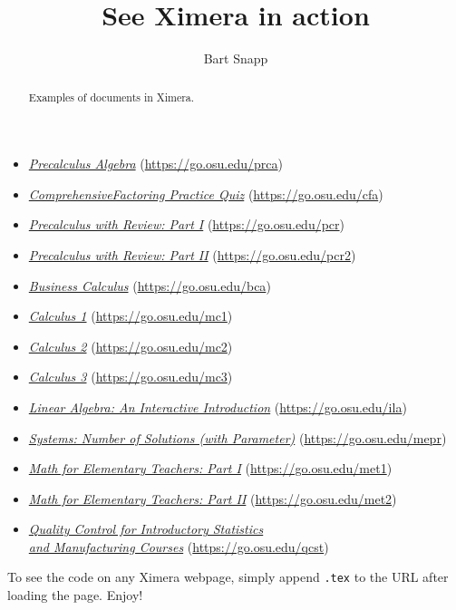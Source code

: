 \documentclass{ximera}
\title{See Ximera in action}
\author{Bart Snapp}
\begin{document}
\begin{abstract}
Examples of documents in Ximera.
\end{abstract}
\maketitle


\renewcommand*{\link}[2][]{\href{#2}{#1}%
\hfill(\url{#2})
}

\begin{itemize}[label={},leftmargin=*]
\item \link[\textit{Precalculus Algebra}]{https://go.osu.edu/prca} 
\item \link[\textit{ComprehensiveFactoring   Practice   Quiz}]{https://go.osu.edu/cfa}
\item \link[\textit{Precalculus with Review: Part I}]{https://go.osu.edu/pcr}        
\item \link[\textit{Precalculus with Review: Part II}]{https://go.osu.edu/pcr2}        
\item \link[\textit{Business Calculus}]{https://go.osu.edu/bca}
\item \link[\textit{Calculus 1}]{https://go.osu.edu/mc1}
\item \link[\textit{Calculus 2}]{https://go.osu.edu/mc2}
\item \link[\textit{Calculus 3}]{https://go.osu.edu/mc3}
\item \link[\textit{Linear  Algebra: An Interactive Introduction}]{https://go.osu.edu/ila} 
\item \link[\textit{Systems: Number of Solutions (with Parameter)}]{https://go.osu.edu/mepr} 
\item \link[\textit{Math for Elementary Teachers:	 Part I}]{https://go.osu.edu/met1} 
\item \link[\textit{Math for Elementary Teachers: Part II}]{https://go.osu.edu/met2}
\item \link[\textit{Quality Control for Introductory Statistics\\ and Manufacturing Courses}]{https://go.osu.edu/qcst} 
\end{itemize}
To see the code on any Ximera webpage, simply append \verb!.tex! to the URL after loading the page. Enjoy!
\end{document}

